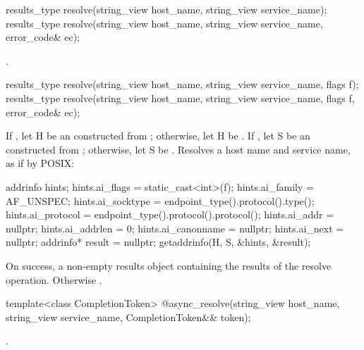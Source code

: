 \begin{itemdecl}
results_type resolve(string_view host_name, string_view service_name);
results_type resolve(string_view host_name, string_view service_name,
                     error_code& ec);
\end{itemdecl}

\begin{itemdescr}
\pnum
\returns {}.
\end{itemdescr}

\begin{itemdecl}
results_type resolve(string_view host_name, string_view service_name,
                     flags f);
results_type resolve(string_view host_name, string_view service_name,
                     flags f, error_code& ec);
\end{itemdecl}

\begin{itemdescr}
\pnum
\effects If , let H be an \ntbs constructed from ; otherwise, let H be . If , let S be an \ntbs constructed from ; otherwise, let S be . Resolves a host name and service name, as if by POSIX:
\begin{codeblock}
addrinfo hints;
hints.ai_flags = static_cast<int>(f);
hints.ai_family = AF_UNSPEC;
hints.ai_socktype = endpoint_type().protocol().type();
hints.ai_protocol = endpoint_type().protocol().protocol();
hints.ai_addr = nullptr;
hints.ai_addrlen = 0;
hints.ai_canonname = nullptr;
hints.ai_next = nullptr;
addrinfo* result = nullptr;
getaddrinfo(H, S, &hints, &result);
\end{codeblock}


\pnum
\returns On success, a non-empty results object containing the results of the resolve operation. Otherwise .
\end{itemdescr}

\begin{itemdecl}
template<class CompletionToken>
  @\DEDUCED@ async_resolve(string_view host_name, string_view service_name,
                        CompletionToken&& token);
\end{itemdecl}

\begin{itemdescr}
\pnum
\returns {}.
\end{itemdescr}

